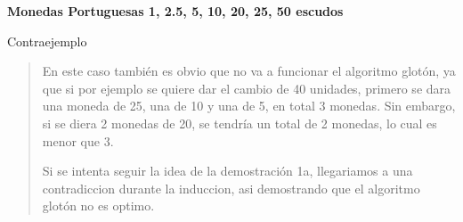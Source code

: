 \textbf{Monedas Portuguesas 1, 2.5, 5, 10, 20, 25, 50 escudos}\vspace{.2cm}

\textcolor{bibi}{Contraejemplo}
\begin{quote}
    En este caso también es obvio que no va a funcionar el algoritmo glotón, ya que si por ejemplo se quiere dar el cambio de 40 unidades, primero se dara una moneda de 25, una de 10 y una de 5, en total 3 monedas. Sin embargo, si se diera 2 monedas de 20, se tendría un total de 2 monedas, lo cual es menor que 3. \vspace{.2cm}

    Si se intenta seguir la idea de la demostración 1a, llegariamos a una contradiccion durante la induccion, asi demostrando que el algoritmo glotón no es optimo. \vspace{.2cm}
\end{quote}